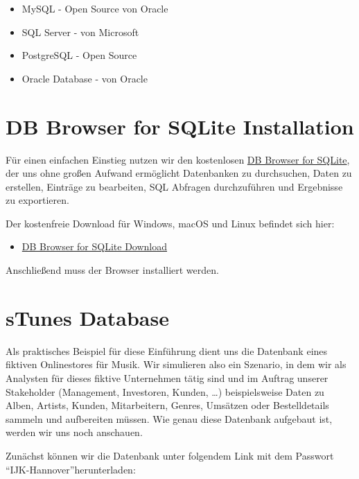 \documentclass[
]{book}
\providecommand{\tightlist}{%
  \setlength{\itemsep}{0pt}\setlength{\parskip}{0pt}}
\begin{document}
\begin{itemize}
\tightlist
\item
  MySQL - Open Source von Oracle\\
\item
  SQL Server - von Microsoft\\
\item
  PostgreSQL - Open Source\\
\item
  Oracle Database - von Oracle
\end{itemize}

\hypertarget{db-browser-for-sqlite-installation}{%
\section{DB Browser for SQLite Installation}\label{db-browser-for-sqlite-installation}}

Für einen einfachen Einstieg nutzen wir den kostenlosen \href{https://sqlitebrowser.org/}{DB Browser for SQLite}, der uns ohne großen Aufwand ermöglicht Datenbanken zu durchsuchen, Daten zu erstellen, Einträge zu bearbeiten, SQL Abfragen durchzuführen und Ergebnisse zu exportieren.

Der kostenfreie Download für Windows, macOS und Linux befindet sich hier:

\begin{itemize}
\tightlist
\item
  \href{https://sqlitebrowser.org/dl/}{DB Browser for SQLite Download}
\end{itemize}

Anschließend muss der Browser installiert werden.

\hypertarget{stunes-database}{%
\section{sTunes Database}\label{stunes-database}}

Als praktisches Beispiel für diese Einführung dient uns die Datenbank eines fiktiven Onlinestores für Musik. Wir simulieren also ein Szenario, in dem wir als Analysten für dieses fiktive Unternehmen tätig sind und im Auftrag unserer Stakeholder (Management, Investoren, Kunden, \ldots) beispielsweise Daten zu Alben, Artists, Kunden, Mitarbeitern, Genres, Umsätzen oder Bestelldetails sammeln und aufbereiten müssen. Wie genau diese Datenbank aufgebaut ist, werden wir uns noch anschauen.

Zunächst können wir die Datenbank unter folgendem Link mit dem Passwort ``IJK-Hannover''herunterladen:
\end{document}
